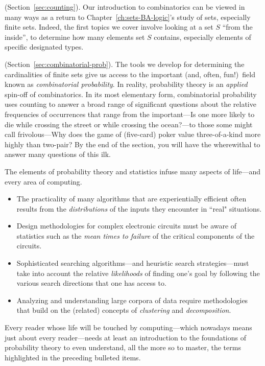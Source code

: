 \medskip


 (Section~\ref{sec:counting}).
Our introduction to combinatorics can be viewed in many ways as a return to Chapter~\ref{ch:sets-BA-logic}'s study of sets, especially finite sets.  Indeed, the first topics we cover involve looking at a set $S$ ``from the inside'', to determine how many elements set $S$ contains, especially elements of specific designated types.

\medskip

 
 

 (Section~\ref{sec:combinatorial-prob}).
The tools we develop for determining the cardinalities of finite sets give us access to the important (and, often, fun!)~field known as {\em combinatorial probability}.  In reality, probability theory is an {\em applied} spin-off of combinatorics.  In its most elementary form, combinatorial probability uses counting to answer a broad range of significant questions about the relative frequencies of occurrences that range from the important---Is one more likely to die while crossing the street or while crossing the ocean?---to those some might call frivolous---Why does the game of (five-card) poker value three-of-a-kind more highly than two-pair?  By the end of the section, you will have the wherewithal to answer many questions of this ilk.

\smallskip

The elements of probability theory and statistics infuse many aspects of life---and every area of computing.
\begin{itemize}
\item
The practicality of many algorithms that are experientially efficient often results from the {\em distributions} of the inputs they encounter in ``real" situations.
\medskip\item
Design methodologies for complex electronic circuits must be aware of statistics such as the {\em mean times to failure} of the critical components of the circuits.
\medskip\item
Sophisticated searching algorithms---and heuristic search strategies---must take into account the relative
{\em likelihoods} of finding one's goal by following the various search directions that one has access to.
\medskip\item
Analyzing and understanding large corpora of data require methodologies that build on the (related) concepts of {\em clustering} and {\em decomposition}.
\end{itemize}
Every reader whose life will be touched by computing---which nowadays means just about every reader---needs at least an introduction to the foundations of probability theory to even understand, all the more so to master, the terms highlighted in the preceding bulleted items.

